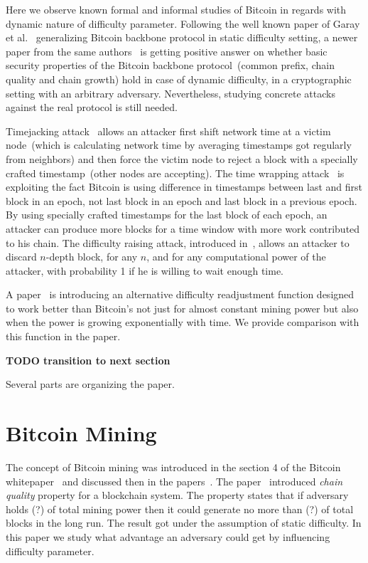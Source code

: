 \documentclass[]{llncs}
\begin{document}
Here we observe known formal and informal studies of Bitcoin in regards with dynamic nature of difficulty parameter. Following the well known paper of Garay et al.~\cite{garay2015bitcoin} generalizing Bitcoin backbone protocol in static difficulty setting, a newer paper from the same authors~\cite{gkl16} is getting positive answer on whether basic security properties of the Bitcoin backbone protocol~(common prefix, chain quality and chain growth) hold in case of dynamic difficulty, in a cryptographic setting with an arbitrary adversary. Nevertheless, studying concrete attacks against the real protocol is still needed.      

Timejacking attack~\cite{timejacking2011} allows an attacker first shift network time at a victim node~(which is calculating network time by averaging timestamps got regularly from neighbors) and then force the victim node to reject a block with a specially crafted timestamp~(other nodes are accepting). The time wrapping attack~\cite{artforz2011} is exploiting the fact Bitcoin is using difference in timestamps between last and first block in an epoch, not last block in an epoch and last block in a previous epoch. By using specially crafted timestamps for the last block of each epoch, an attacker can produce more blocks for a time window with more work contributed to his chain. The difficulty raising attack, introduced in~\cite{bahack2013theoretical}, allows an attacker to discard $n$-depth block, for any $n$, and for any computational power of the attacker, with probability 1 if he is willing to wait enough time.

A paper~\cite{kraft2015difficulty} is introducing an alternative difficulty readjustment function designed to work better than Bitcoin's not just for almost constant mining power but also when the power is growing exponentially with time. We provide comparison with this function in the paper.  

\textbf{TODO transition to next section}

Several parts are organizing the paper. 

\section{Bitcoin Mining}
\label{sec:bit}

The concept of Bitcoin mining was introduced in the section 4 of the Bitcoin whitepaper~\cite{Nakamoto2008} and discussed then in the papers~\cite{kraft2015difficulty, miller2014permacoin, eyal2014majority, garay2015bitcoin}. The paper~\cite{garay2015bitcoin} introduced \textit{chain quality} property for a blockchain system. The property states that if adversary holds (?) of total mining power then it could generate no more than (?) of total blocks in the long run. The result got under the assumption of static difficulty. In this paper we study what advantage an adversary could get by influencing difficulty parameter.
\end{document}

